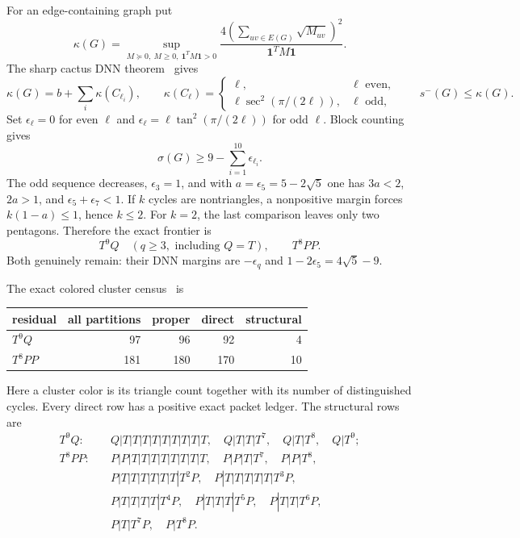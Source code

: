 \documentclass[11pt]{article}
\newcommand{\smE}{s^-}
\newcommand{\sig}{\sigma}
\newcommand{\one}{\mathbf 1}
\begin{document}
For an edge-containing graph put
\[
 \kappa(G)=\sup_{M\succeq0,\ M\geq0,\ \one^TM\one>0}
 \frac{4(\sum_{uv\in E(G)}\sqrt{M_{uv}})^2}{\one^TM\one}.
\]
The sharp cactus DNN theorem~\cite{DNN,LTZ} gives
\[
 \kappa(G)=b+\sum_i\kappa(C_{\ell_i}),
 \qquad
 \kappa(C_\ell)=\begin{cases}\ell,&\ell\text{ even},\\
 \ell\sec^2(\pi/(2\ell)),&\ell\text{ odd},\end{cases}
 \qquad \smE(G)\leq\kappa(G).
\]
Set $\epsilon_\ell=0$ for even $\ell$ and
$\epsilon_\ell=\ell\tan^2(\pi/(2\ell))$ for odd $\ell$.  Block counting gives
\begin{equation}\label{eq:dnn}
 \sig(G)\geq9-\sum_{i=1}^{10}\epsilon_{\ell_i}.
\end{equation}
The odd sequence decreases, $\epsilon_3=1$, and with
$a=\epsilon_5=5-2\sqrt5$ one has
$3a<2$, $2a>1$, and $\epsilon_5+\epsilon_7<1$.  If $k$ cycles are
nontriangles, a nonpositive margin forces $k(1-a)\leq1$, hence $k\leq2$.
For $k=2$, the last comparison leaves only two pentagons.  Therefore the exact
frontier is
\begin{equation}\label{eq:residuals}
 T^9Q\quad(q\geq3,\text{ including }Q=T),
 \qquad T^8PP.
\end{equation}
Both genuinely remain: their DNN margins are $-\epsilon_q$ and
$1-2\epsilon_5=4\sqrt5-9$.

The exact colored cluster census~\cite{Frontier} is
\begin{center}
\begin{tabular}{lrrrr}
\toprule
residual&all partitions&proper&direct&structural\\
\midrule
$T^9Q$&97&96&92&4\\
$T^8PP$&181&180&170&10\\
\bottomrule
\end{tabular}
\end{center}
Here a cluster color is its triangle count together with its number of
distinguished cycles.  Every direct row has a positive exact packet ledger.
The structural rows are
\begin{align*}
T^9Q:
&\quad Q|T|T|T|T|T|T|T|T|T,
\quad Q|T|T|T^7,
\quad Q|T|T^8,
\quad Q|T^9;\\
T^8PP:
&\quad P|P|T|T|T|T|T|T|T|T,
\quad P|P|T|T^7,
\quad P|P|T^8,\\
&\quad P|T|T|T|T|T|T|T^2P,
\quad P|T|T|T|T|T|T^3P,\\
&\quad P|T|T|T|T|T^4P,
\quad P|T|T|T|T^5P,
\quad P|T|T|T^6P,\\
&\quad P|T|T^7P,
\quad P|T^8P.
\end{align*}
\end{document}
